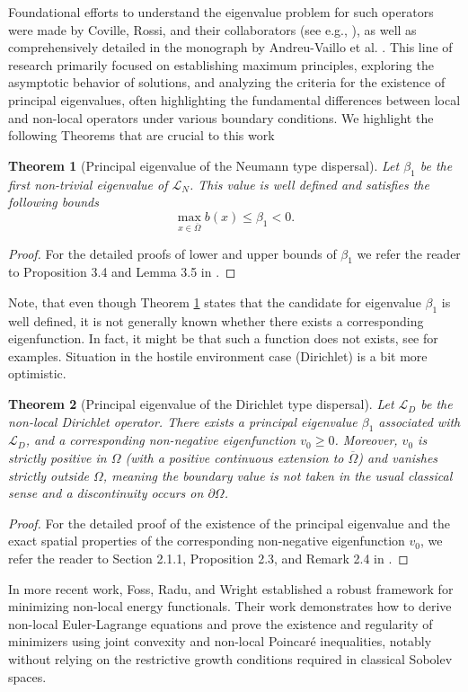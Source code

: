 \documentclass[12pt, a4paper]{article}
\theoremstyle{break}
\newtheorem{thm}{Theorem}[section]
\theoremstyle{break}
\theoremstyle{break}
\theoremstyle{break}
\theoremstyle{break}
\theoremstyle{break}
\theoremstyle{break}
\theoremstyle{break}
\theoremstyle{break}
\begin{document}
Foundational efforts to understand the eigenvalue problem for such operators were made by Coville, Rossi, and their collaborators (see e.g., \cite{ChasseigneChavesRossi2006, Coville2010, GarciaMelianRossi2009}), as well as comprehensively detailed in the monograph by Andreu-Vaillo et al. \cite{AndreuVaillo2010}. This line of research primarily focused on establishing maximum principles, exploring the asymptotic behavior of solutions, and analyzing the criteria for the existence of principal eigenvalues, often highlighting the fundamental differences between local and non-local operators under various boundary conditions. We highlight the following Theorems that are crucial to this work
\begin{thm}[Principal eigenvalue of the Neumann type dispersal]
    \label{thm:beta1_bounds}
    Let $\beta_1$ be the first non-trivial eigenvalue of $\mathcal{L}_N$. This value is well defined and satisfies the following bounds
    \begin{equation}
        \max_{x\in\overline{\Omega}} b(x) \leq \beta_1 < 0.
    \end{equation}
\end{thm}
\begin{proof}
    For the detailed proofs of lower and upper bounds of $\beta_1$ we refer the reader to Proposition 3.4 and Lemma 3.5 in \cite{AndreuVaillo2010}.
\end{proof}
Note, that even though Theorem \ref{thm:beta1_bounds} states that the candidate for eigenvalue $\beta_1$ is well defined, it is not generally known whether there exists a corresponding eigenfunction. In fact, it might be that such a function does not exists, see \cite{Coville2010, ShenZhang2010} for examples. Situation in the hostile environment case (Dirichlet) is a bit more optimistic.
\begin{thm}[Principal eigenvalue of the Dirichlet type dispersal]
    \label{thm:dirichlet_principal_eigenvalue}
    Let $\mathcal{L}_D$ be the non-local Dirichlet operator. There exists a principal eigenvalue $\beta_1$ associated with $\mathcal{L}_D$, and a corresponding non-negative eigenfunction $v_0 \ge 0$. Moreover, $v_0$ is strictly positive in $\Omega$ (with a positive continuous extension to $\overline{\Omega}$) and vanishes strictly outside $\Omega$, meaning the boundary value is not taken in the usual classical sense and a discontinuity occurs on $\partial\Omega$.
\end{thm}
\begin{proof}
    For the detailed proof of the existence of the principal eigenvalue and the exact spatial properties of the corresponding non-negative eigenfunction $v_0$, we refer the reader to Section 2.1.1, Proposition 2.3, and Remark 2.4 in \cite{AndreuVaillo2010}.
\end{proof}
In more recent work, Foss, Radu, and Wright \cite{FossRaduWright2018} established a robust framework for minimizing non-local energy functionals. Their work demonstrates how to derive non-local Euler-Lagrange equations and prove the existence and regularity of minimizers using joint convexity and non-local Poincar\'e inequalities, notably without relying on the restrictive growth conditions required in classical Sobolev spaces.
\end{document}

